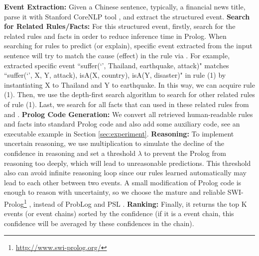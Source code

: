 \textbf{Event Extraction:} Given a Chinese sentence, typically, a financial news title, parse it with Stanford CoreNLP tool \cite{Manning}, and extract the structured event. 
\textbf{Search for Related Rules/Facts:} For this structured event, firstly, search for the related rules and facts in order to reduce inference time in Prolog. When searching for rules to predict (or explain), specific event extracted from the input sentence will try to match the cause (effect) in the rule via \zhpro. For example, extracted specific event ``suffer(`', Thailand, earthquake, attack)" matches ``suffer(`', X, Y, attack), isA(X, country), isA(Y, disaster)" in rule (1) by instantiating X to Thailand and Y to earthquake. In this way, we can acquire rule (1). Then, we use the depth-first search algorithm to search for other related rules of rule (1). Last, we search for all facts that can used in these related rules from \zhpro and \zhcon.
\textbf{Prolog Code Generation:}
We convert all retrieved human-readable rules and facts into standard Prolog code and also add some auxiliary code, see an executable example in Section \ref{sec:experiment}.
\textbf{Reasoning:}
To implement uncertain reasoning, we use multiplication to simulate the decline of the confidence in reasoning and set a threshold $\lambda$ to prevent the Prolog from reasoning too deeply, which will lead to unreasonable predictions. This threshold also can avoid infinite reasoning loop since our rules learned automatically may lead to each other between two events. A small modification of Prolog code 
is enough to reason with uncertainty, so we choose the mature and reliable SWI-Prolog\footnote{\url{http://www.swi-prolog.org/}} \cite{Wielemaker2010}, instead of ProbLog \cite{de2007problog} and PSL \cite{bach:jmlr17}.
\textbf{Ranking:}
Finally, it returns the top K events (or event chains) sorted by the confidence (if it is a event chain, this confidence will be averaged by these confidences in the chain).